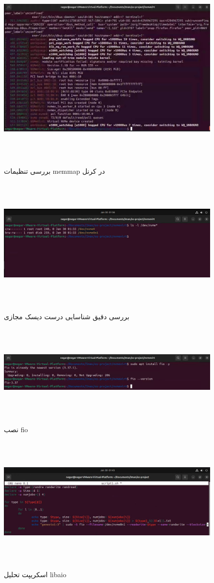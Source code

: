 ‫
‫\begin{figure}[H]
‫	‫    \centering
‫	‫    \includegraphics[width=\textwidth]{figs/15.jpg}
‫	‫    \caption{بررسی تنظیمات memmap در کرنل}
‫\end{figure}
‫
‫‫‫\begin{figure}[H]
‫	‫	‫	‫    \centering
‫	‫	‫	‫    \includegraphics[width=\textwidth]{figs/16.jpg}
‫			\caption{بررسی دقیق شناسایی درست دیسک مجازی}
‫\end{figure}
‫
‫‫‫\begin{figure}[H]
‫	‫	‫	‫    \centering
‫	‫	‫	‫    \includegraphics[width=\textwidth]{figs/17.jpg}
‫			\caption{نصب fio}
‫\end{figure}
‫
‫‫‫\begin{figure}[H]
‫	‫	‫	‫    \centering
‫	‫	‫	‫    \includegraphics[width=\textwidth]{figs/18.jpg}
‫			\caption{اسکریپت تحلیل libaio}
‫\end{figure}
